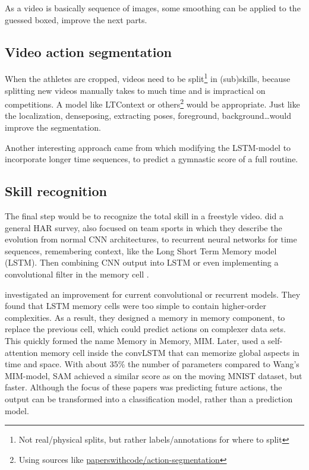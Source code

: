 As a video is basically sequence of images, some smoothing can be applied to the guessed boxed, improve the next parts.

\subsection{Video action segmentation}

When the athletes are cropped, videos need to be split\footnote{Not real/physical splits, but rather labels/annotations for where to split} in (sub)skills, because splitting new videos manually takes to much time and is impractical on competitions.
A model like LTContext \textcite{Jiaming_2023} or others\footnote{Using sources like \href{https://paperswithcode.com/task/action-segmentation}{paperswithcode/action-segmentation}} would be appropriate. 
Just like the localization, denseposing, extracting poses, foreground, background\dots would improve the segmentation.

Another interesting approach came from \textcite{Zahan_2023} which modifying the LSTM-model to incorporate longer time sequences, to predict a gymnastic score of a full routine. %

\subsection{Skill recognition}
\label{subsec:skill-recognition}

The final step would be to recognize the total skill in a freestyle video.
\textcite{Yin_2024} did a general HAR survey, also focused on team sports in which they describe the evolution from normal CNN architectures, to recurrent neural networks for time sequences, remembering context, like the Long Short Term Memory model (LSTM). Then combining CNN output into LSTM or even implementing a convolutional filter in the memory cell \autocite{Shi_2015}.

\textcite{Wang_2019} investigated an improvement for current convolutional or recurrent models. They found that LSTM memory cells were too simple to contain higher-order complexities. As a result, they designed a memory in memory component, to replace the previous cell, which could predict actions on complexer data sets. This quickly formed the name Memory in Memory, MIM. Later, \textcite{Lin_2020} used a self-attention memory cell inside the convLSTM that can memorize global aspects in time and space. With about 35\% the number of parameters compared to Wang's MIM-model, SAM achieved a similar score as on the moving MNIST dataset, but faster. Although the focus of these papers was predicting future actions, the output can be transformed into a classification model, rather than a prediction model.

